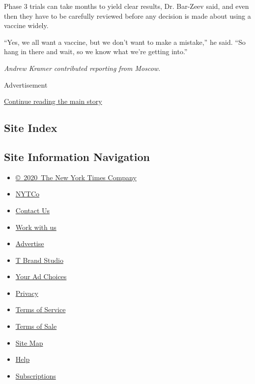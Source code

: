 Phase 3 trials can take months to yield clear results, Dr. Bar-Zeev
said, and even then they have to be carefully reviewed before any
decision is made about using a vaccine widely.

``Yes, we all want a vaccine, but we don't want to make a mistake,'' he
said. ``So hang in there and wait, so we know what we're getting into.''

\emph{Andrew Kramer contributed reporting from Moscow.}

Advertisement

\protect\hyperlink{after-bottom}{Continue reading the main story}

\hypertarget{site-index}{%
\subsection{Site Index}\label{site-index}}

\hypertarget{site-information-navigation}{%
\subsection{Site Information
Navigation}\label{site-information-navigation}}

\begin{itemize}
\tightlist
\item
  \href{https://help.nytimes3xbfgragh.onion/hc/en-us/articles/115014792127-Copyright-notice}{©~2020~The
  New York Times Company}
\end{itemize}

\begin{itemize}
\tightlist
\item
  \href{https://www.nytco.com/}{NYTCo}
\item
  \href{https://help.nytimes3xbfgragh.onion/hc/en-us/articles/115015385887-Contact-Us}{Contact
  Us}
\item
  \href{https://www.nytco.com/careers/}{Work with us}
\item
  \href{https://nytmediakit.com/}{Advertise}
\item
  \href{http://www.tbrandstudio.com/}{T Brand Studio}
\item
  \href{https://www.nytimes3xbfgragh.onion/privacy/cookie-policy\#how-do-i-manage-trackers}{Your
  Ad Choices}
\item
  \href{https://www.nytimes3xbfgragh.onion/privacy}{Privacy}
\item
  \href{https://help.nytimes3xbfgragh.onion/hc/en-us/articles/115014893428-Terms-of-service}{Terms
  of Service}
\item
  \href{https://help.nytimes3xbfgragh.onion/hc/en-us/articles/115014893968-Terms-of-sale}{Terms
  of Sale}
\item
  \href{https://spiderbites.nytimes3xbfgragh.onion}{Site Map}
\item
  \href{https://help.nytimes3xbfgragh.onion/hc/en-us}{Help}
\item
  \href{https://www.nytimes3xbfgragh.onion/subscription?campaignId=37WXW}{Subscriptions}
\end{itemize}
